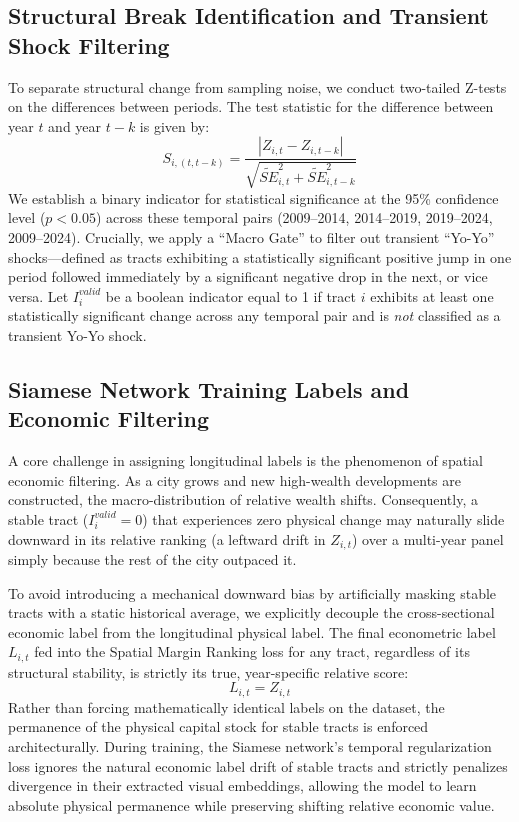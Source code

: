 \documentclass[12pt]{article}
\begin{document}
\subsection{Structural Break Identification and Transient Shock Filtering}
To separate structural change from sampling noise, we conduct two-tailed Z-tests on the differences between periods. The test statistic for the difference between year $t$ and year $t-k$ is given by:
\begin{equation}
S_{i, (t, t-k)} = \frac{|Z_{i,t} - Z_{i,t-k}|}{\sqrt{\tilde{SE}_{i,t}^2 + \tilde{SE}_{i,t-k}^2}}
\end{equation}
We establish a binary indicator for statistical significance at the 95\% confidence level ($p < 0.05$) across these temporal pairs (2009–2014, 2014–2019, 2019–2024, 2009–2024). Crucially, we apply a ``Macro Gate'' to filter out transient ``Yo-Yo'' shocks---defined as tracts exhibiting a statistically significant positive jump in one period followed immediately by a significant negative drop in the next, or vice versa. Let $I_{i}^{valid}$ be a boolean indicator equal to 1 if tract $i$ exhibits at least one statistically significant change across any temporal pair and is \textit{not} classified as a transient Yo-Yo shock.

\subsection{Siamese Network Training Labels and Economic Filtering}
A core challenge in assigning longitudinal labels is the phenomenon of spatial economic filtering. As a city grows and new high-wealth developments are constructed, the macro-distribution of relative wealth shifts. Consequently, a stable tract ($I_{i}^{valid} = 0$) that experiences zero physical change may naturally slide downward in its relative ranking (a leftward drift in $Z_{i,t}$) over a multi-year panel simply because the rest of the city outpaced it.

To avoid introducing a mechanical downward bias by artificially masking stable tracts with a static historical average, we explicitly decouple the cross-sectional economic label from the longitudinal physical label. The final econometric label $L_{i,t}$ fed into the Spatial Margin Ranking loss for any tract, regardless of its structural stability, is strictly its true, year-specific relative score:
\begin{equation}
L_{i,t} = Z_{i,t}
\end{equation}
Rather than forcing mathematically identical labels on the dataset, the permanence of the physical capital stock for stable tracts is enforced architecturally. During training, the Siamese network's temporal regularization loss ignores the natural economic label drift of stable tracts and strictly penalizes divergence in their extracted visual embeddings, allowing the model to learn absolute physical permanence while preserving shifting relative economic value.
\end{document}
